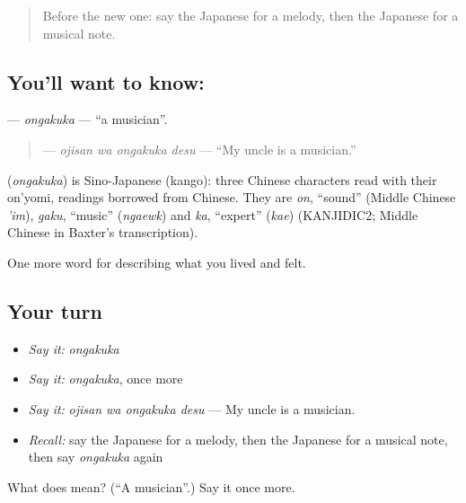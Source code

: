 \begin{quote}
Before the new one: say the Japanese for a melody, then the Japanese for a musical note.
\end{quote}

\subsection*{You'll want to know: }
\textbf{} — \emph{ongakuka} — \textquotedblleft{}a musician\textquotedblright{}.

\begin{quote}
\textbf{ } — \emph{ojisan wa ongakuka desu} — \textquotedblleft{}My uncle is a musician.\textquotedblright{}
\end{quote}

\begin{cousinweb}
\textbf{} (\emph{ongakuka}) is Sino-Japanese (kango): three Chinese characters read with their on'yomi, readings borrowed from Chinese. They are \emph{on}, \textquotedblleft{}sound\textquotedblright{} (Middle Chinese \emph{'im}), \emph{gaku}, \textquotedblleft{}music\textquotedblright{} (\emph{ngaewk}) and \emph{ka}, \textquotedblleft{}expert\textquotedblright{} (\emph{kae}) (KANJIDIC2; Middle Chinese in Baxter's transcription).
\end{cousinweb}

\begin{grammarlens}[title={What you've built}]
One more word for describing what you lived and felt.
\end{grammarlens}

\subsection*{Your turn}
\begin{itemize}
\raggedright
  \item \emph{Say it:} \emph{ongakuka}
  \item \emph{Say it:} \emph{ongakuka}, once more
  \item \emph{Say it:} \emph{ojisan wa ongakuka desu} — My uncle is a musician.
  \item \emph{Recall:} say the Japanese for a melody, then the Japanese for a musical note, then say \emph{ongakuka} again
\end{itemize}

\begin{tcolorbox}[breakable,colback=teal!4,colframe=teal!35!black,title={Before you move on}]
What does  mean? (\textquotedblleft{}A musician\textquotedblright{}.) Say it once more.
\end{tcolorbox}
